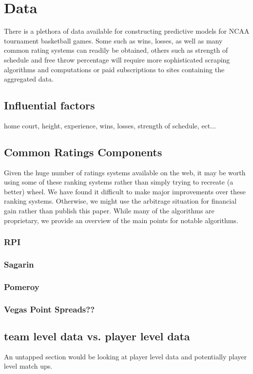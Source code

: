 \section{Data}
There is a plethora of data available for constructing predictive models for NCAA tournament basketball games.  Some such as wins, losses, as well as many common rating systems can readily be obtained, others such as strength of schedule and free throw percentage will require more sophisticated scraping algorithms and computations or paid subscriptions to sites containing the aggregated data.
\subsection{Influential factors} home court, height, experience, wins, losses, strength of schedule, ect...
\subsection{Common Ratings Components} Given the huge number of ratings systems available on the web, it may be worth using some of these ranking systems rather than simply trying to recreate (a better) wheel.  We have found it difficult to make major improvements over these ranking systems.  Otherwise, we might use the arbitrage situation for financial gain rather than publish this paper.  While many of the algorithms are proprietary, we provide an overview of the main points for notable algorithms.

\subsubsection{RPI}
\subsubsection{Sagarin}
\subsubsection{Pomeroy}
\subsubsection{Vegas Point Spreads??}

\subsection{team level data vs. player level data}
An untapped section would be looking at player level data and potentially player level match ups.  
